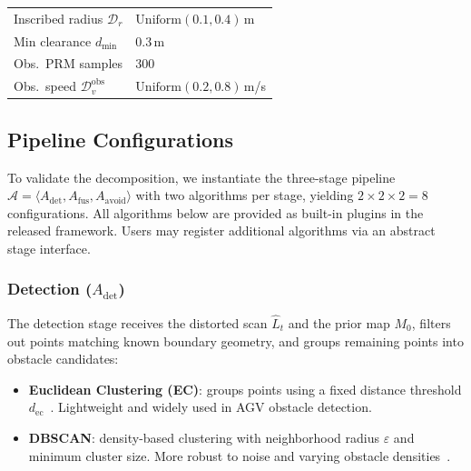 \documentclass[conference]{IEEEtran}
\begin{document}
\begin{table}[t]
\begin{center}
\begin{tabular}{|l|l|}
            Inscribed radius $\mathcal{D}_r$ & $\mathrm{Uniform}(0.1, 0.4)$\,m \\
            Min clearance $d_{\min}$ & 0.3\,m \\
            Obs.\ PRM samples & 300 \\
            Obs.\ speed $\mathcal{D}_v^{\text{obs}}$ & $\mathrm{Uniform}(0.2, 0.8)$\,m/s \\
            \hline
        \end{tabular}
    \end{center}
    \vspace{-7px}
\end{table}

\subsection{Pipeline Configurations}
\label{sec:pipeline-configs}
To validate the decomposition, we instantiate the three-stage pipeline $\mathcal{A} = \langle A_{\text{det}}, A_{\text{fus}}, A_{\text{avoid}} \rangle$ with two algorithms per stage, yielding $2 \times 2 \times 2 = 8$ configurations. All algorithms below are provided as built-in plugins in the released framework. Users may register additional algorithms via an abstract stage interface.
 
\subsubsection{Detection ($A_{\text{det}}$)}
The detection stage receives the distorted scan $\hat{L}_t$ and the prior map $M_0$, filters out points matching known boundary geometry, and groups remaining points into obstacle candidates:
\begin{itemize}
    \item \textbf{Euclidean Clustering (EC)}: groups points using a fixed distance threshold $d_{\text{ec}}$~\cite{rusu2011pcl}. Lightweight and widely used in AGV obstacle detection.
    \item \textbf{DBSCAN}: density-based clustering with neighborhood radius $\varepsilon$ and minimum cluster size. More robust to noise and varying obstacle densities~\cite{ester1996dbscan}.
\end{itemize}
 
\end{document}
